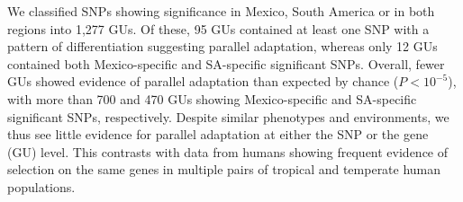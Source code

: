 {We classified SNPs showing significance in Mexico, South America or in both regions into 1,277 GUs. 
Of these, 95 GUs contained at least one SNP with a pattern of differentiation suggesting parallel adaptation, whereas only 12 GUs contained both Mexico-specific and SA-specific significant SNPs. 
Overall, fewer GUs showed evidence of parallel adaptation than expected by chance ($P<10^{-5}$), with more than 700 and 470 GUs showing Mexico-specific and SA-specific significant SNPs, respectively.  
Despite similar phenotypes and environments, we thus see little evidence for parallel adaptation at either the SNP or the gene (GU) level.  
This contrasts with data from humans \citep{Tennessen_2011_21698142} showing frequent evidence of selection on the same genes in multiple pairs of tropical and temperate human populations.  




}

